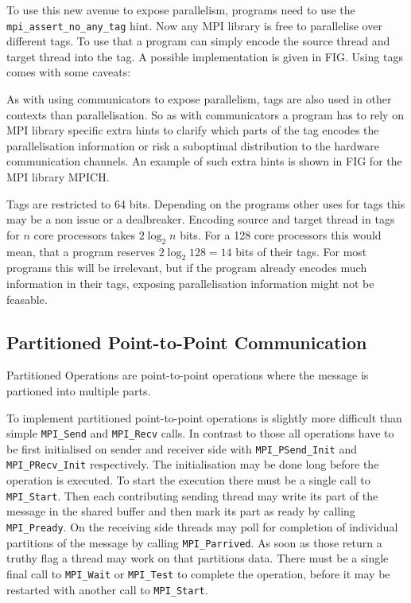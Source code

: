 \documentclass[sigconf]{acmart}
\begin{document}
To use this new avenue to expose parallelism, programs need to use the \verb|mpi_assert_no_any_tag| hint.
Now any MPI library is free to parallelise over different tags.
To use that a program can simply encode the source thread and target thread into the tag.
A possible implementation is given in FIG. %
Using tags comes with some caveats:

As with using communicators to expose parallelism, tags are also used in other contexts than parallelisation.
So as with communicators a program has to rely on MPI library specific extra hints to clarify which parts of the tag encodes the parallelisation information or risk a suboptimal distribution to the hardware communication channels.
An example of such extra hints is shown in FIG for the MPI library MPICH. %

Tags are restricted to 64 bits.
Depending on the programs other uses for tags this may be a non issue or a dealbreaker.
Encoding source and target thread in tags for $n$ core processors takes $2\log_2{n}$ bits.
For a 128 core processors this would mean, that a program reserves $2\log_2{128} = 14$ bits of their tags.
For most programs this will be irrelevant, but if the program already encodes much information in their tags, exposing parallelisation information might not be feasable.

\subsection{Partitioned Point-to-Point Communication}


Partitioned Operations are point-to-point operations where the message is partioned into multiple parts.

To implement partitioned point-to-point operations is slightly more difficult than simple \verb|MPI_Send| and \verb|MPI_Recv| calls.
In contrast to those all operations have to be first initialised on sender and receiver side with \verb|MPI_PSend_Init| and \verb|MPI_PRecv_Init| respectively.
The initialisation may be done long before the operation is executed.
To start the execution there must be a single call to \verb|MPI_Start|.
Then each contributing sending thread may write its part of the message in the shared buffer and then mark its part as ready by calling \verb|MPI_Pready|.
On the receiving side threads may poll for completion of individual partitions of the message by calling \verb|MPI_Parrived|.
As soon as those return a truthy flag a thread may work on that partitions data.
There must be a single final call to \verb|MPI_Wait| or \verb|MPI_Test| to complete the operation, before it may be restarted with another call to \verb|MPI_Start|.
\end{document}
